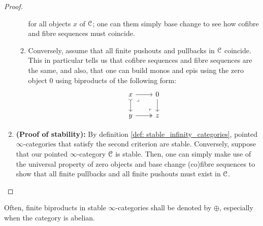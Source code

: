\begin{proof}
\begin{enumerate}
\begin{enumerate}
                                for all objects $x$ of $\mathcal{C}$; one can them simply base change to see how cofibre and fibre sequences must coincide.
                                \item Conversely, assume that all finite pushouts and pullbacks in $\mathcal{C}$ coincide. This in particular tells us that cofibre sequences and fibre sequences are the same, and also, that one can build monos and epis using the zero object $0$ using biproducts of the following form:
                                    $$
                                        \begin{tikzcd}
                                        	x & 0 \\
                                        	y & z
                                        	\arrow[from=1-2, to=2-2]
                                        	\arrow[two heads, from=2-1, to=2-2]
                                        	\arrow[tail, from=1-1, to=2-1]
                                        	\arrow[from=1-1, to=1-2]
                                        	\arrow["\lrcorner"{anchor=center, pos=0.125}, draw=none, from=1-1, to=2-2]
                                        	\arrow["\lrcorner"{anchor=center, pos=0.125, rotate=180}, draw=none, from=2-2, to=1-1]
                                        \end{tikzcd}
                                    $$
                            \end{enumerate}
                        \item \textbf{(Proof of stability):} By definition \ref{def: stable_infinity_categories}, pointed $\infty$-categories that satisfy the second criterion are stable. Conversely, suppose that our pointed $\infty$-category $\mathcal{C}$ is stable. Then, one can simply make use of the universal property of zero objects and base change (co)fibre sequences to show that all finite pullbacks and all finite pushouts must exist in $\mathcal{C}$. 
                    \end{enumerate}
                \end{proof}
            \begin{convention}
                Often, finite biproducts in stable $\infty$-categories shall be denoted by $\oplus$, especially when the category is abelian.
            \end{convention}  
            
